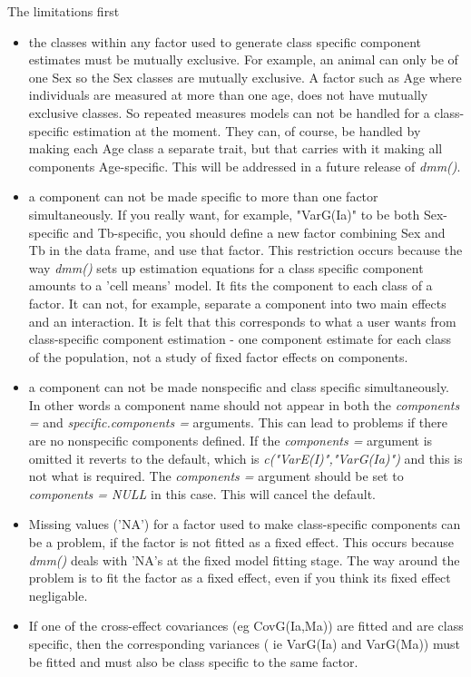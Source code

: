 \documentclass[titlepage]{article}  %
\begin{document}
The limitations first
\begin{itemize}
\item the classes within any factor used to generate class specific component estimates must be mutually exclusive. For example, an animal can only be of one Sex so the Sex classes are mutually exclusive. A factor such as Age where individuals are measured at more than one age, does not have mutually exclusive classes. So repeated measures models can not be handled for a class-specific estimation at the moment. They can, of course, be handled by making each Age class a separate trait, but that carries with it making all components Age-specific.
This will be addressed in a future release of {\em dmm()}.
\item a component can not be made specific to more than one factor simultaneously. If you really want, for example, "VarG(Ia)" to be both Sex-specific and Tb-specific, you should define a new factor combining Sex and Tb in the data frame, and use that factor. This restriction occurs because the way {\em dmm()} sets up estimation equations for a class specific component amounts to a 'cell means' model. It fits the component to each class of a factor. It can not, for example, separate a component into two main effects and an interaction. It is felt that this corresponds to what a user wants from class-specific component estimation - one component estimate for each class of the population, not a study of fixed factor effects on components.
\item a component can not be made nonspecific and class specific simultaneously. In other words a component name should not appear in both the {\em components =} and {\em specific.components =} arguments. This can lead to problems if there are no nonspecific components defined. If the {\em components = } argument is omitted it reverts to the default, which is {\em c("VarE(I)","VarG(Ia)")} and this is not what is required. The {\em components = } argument should be set to {\em components = NULL} in this case. This will cancel the default.
\item Missing values ('NA') for a factor used to make class-specific components can be a problem, if the factor is not fitted as a fixed effect. This occurs because {\em dmm()} deals with 'NA's at the fixed model fitting stage. The way around the problem is to fit the factor as a fixed effect, even if you think its fixed effect negligable.
\item If one of the cross-effect covariances (eg CovG(Ia,Ma)) are fitted and are class specific, then the corresponding variances ( ie VarG(Ia) and VarG(Ma)) must be fitted and must also be class specific to the same factor. 


\end{itemize}
\end{document}
